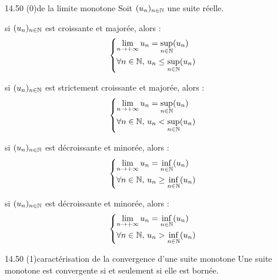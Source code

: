 

\begin{adjustwidth}{-3cm}{-3cm}


\begin{theoreme}{14.50 (0)}{de la limite monotone}
    Soit $(u_n)_{n \in \mathbb{N}}$ une suite réelle.
    \begin{enumeratebf}
        \item si $(u_n)_{n \in \mathbb{N}}$ est croissante et majorée, alors :
        $$\begin{cases*}
            \lim\limits_{n \to +\infty} u_n = \sup\limits_{n\in \N}(u_n) \\
            \forall n \in \N,\, u_n \leq \sup\limits_{n\in \N}(u_n)
        \end{cases*}$$
        \item si $(u_n)_{n \in \mathbb{N}}$ est strictement croissante et majorée, alors :
        $$\begin{cases*}
            \lim\limits_{n \to +\infty} u_n = \sup\limits_{n\in \N}(u_n) \\
            \forall n \in \N,\, u_n < \sup\limits_{n\in \N}(u_n)
        \end{cases*}$$
        \item si $(u_n)_{n \in \mathbb{N}}$ est décroissante et minorée, alors :
        $$\begin{cases*}
            \lim\limits_{n \to +\infty} u_n = \inf\limits_{n\in \N}(u_n) \\
            \forall n \in \N,\, u_n \geq \inf\limits_{n\in \N}(u_n)
        \end{cases*}$$
        \item si $(u_n)_{n \in \mathbb{N}}$ est décroissante et minorée, alors :
        $$\begin{cases*}
            \lim\limits_{n \to +\infty} u_n = \inf\limits_{n\in \N}(u_n) \\
            \forall n \in \N,\, u_n > \inf\limits_{n\in \N}(u_n)
        \end{cases*}$$
        
    \end{enumeratebf}
\end{theoreme}

\begin{proposition}{14.50 (1)}{caractérisation de la convergence d'une suite monotone}
    Une suite monotone est convergente si et seulement si elle est bornée.
\end{proposition}


\end{adjustwidth}
